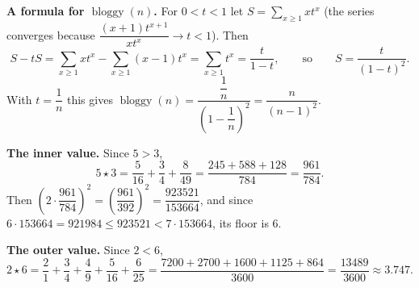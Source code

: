 \textbf{A formula for $\operatorname{bloggy}(n)$.} For $0<t<1$ let $S=\sum_{x\ge1}xt^x$ (the series converges because $\dfrac{(x+1)t^{x+1}}{xt^x}\to t<1$). Then
\[S-tS=\sum_{x\ge1}xt^x-\sum_{x\ge1}(x-1)t^x=\sum_{x\ge1}t^x=\dfrac{t}{1-t},\qquad\text{so}\qquad S=\dfrac{t}{(1-t)^2}.\]
With $t=\dfrac1n$ this gives $\operatorname{bloggy}(n)=\dfrac{\dfrac1n}{\left(1-\dfrac1n\right)^2}=\dfrac{n}{(n-1)^2}$.

\textbf{The inner value.} Since $5>3$,
\[5\star3=\dfrac{5}{16}+\dfrac34+\dfrac{8}{49}=\dfrac{245+588+128}{784}=\dfrac{961}{784}.\]
Then $\left(2\cdot\dfrac{961}{784}\right)^2=\left(\dfrac{961}{392}\right)^2=\dfrac{923521}{153664}$, and since $6\cdot153664=921984\le923521<7\cdot153664$, its floor is $6$.

\textbf{The outer value.} Since $2<6$,
\[2\star6=\dfrac21+\dfrac34+\dfrac49+\dfrac5{16}+\dfrac6{25}=\dfrac{7200+2700+1600+1125+864}{3600}=\boxed{\dfrac{13489}{3600}}\approx3.747.\]
